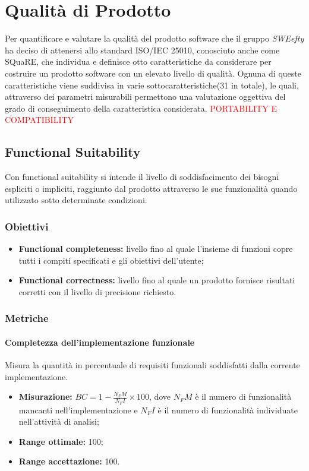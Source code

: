 \section{Qualità di Prodotto}
Per quantificare e valutare la qualità del prodotto software che il gruppo \textit{SWEefty} ha deciso di attenersi allo standard ISO/IEC 25010, conosciuto anche come SQuaRE, che individua e definisce otto caratteristiche da considerare per costruire un prodotto software con un elevato livello di qualità. Ognuna di queste caratteristiche viene suddivisa in varie sottocaratteristiche(31 in totale), le quali, attraverso dei parametri misurabili  permettono una valutazione oggettiva del grado di conseguimento della caratteristica considerata.
\textcolor{red}{PORTABILITY E COMPATIBILITY}
 
	\subsection{Functional Suitability}
	Con functional suitability si intende il livello di soddisfacimento dei bisogni espliciti o impliciti, raggiunto dal prodotto attraverso le sue funzionalità quando utilizzato sotto determinate condizioni.
		\subsubsection{Obiettivi}
			\begin{itemize}
				\item {\textbf{Functional completeness:} livello fino al quale l'insieme di funzioni copre tutti i compiti specificati e gli obiettivi dell'utente;}
				\item {\textbf{Functional correctness:} livello fino al quale un prodotto fornisce risultati corretti con il livello di precisione richiesto.}
			\end{itemize}
		\subsubsection{Metriche}
			\paragraph{Completezza dell'implementazione funzionale}\Spazio
			 Misura la quantità in percentuale di requisiti funzionali soddisfatti dalla corrente implementazione.
			\begin{itemize}
				\item {\textbf{Misurazione:}  $BC=1-\frac{N_FM}{N_FI}\times 100$, dove $N_FM$  è il numero di funzionalità mancanti nell'implementazione e $N_FI$ è il numero di funzionalità individuate nell'attività di analisi};
				\item {\textbf{Range ottimale:} 100;}
				\item {\textbf{Range accettazione:} 100.}
			\end{itemize} 

